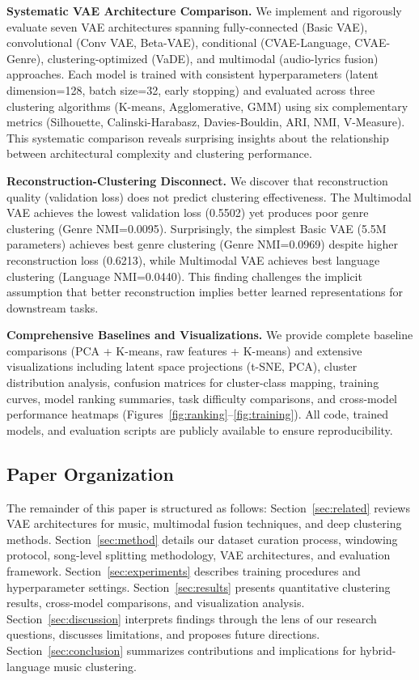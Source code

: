 \documentclass[10pt,twocolumn]{article}
\begin{document}
\textbf{Systematic VAE Architecture Comparison.} We implement and rigorously evaluate seven VAE architectures spanning fully-connected (Basic VAE), convolutional (Conv VAE, Beta-VAE), conditional (CVAE-Language, CVAE-Genre), clustering-optimized (VaDE), and multimodal (audio-lyrics fusion) approaches. Each model is trained with consistent hyperparameters (latent dimension=128, batch size=32, early stopping) and evaluated across three clustering algorithms (K-means, Agglomerative, GMM) using six complementary metrics (Silhouette, Calinski-Harabasz, Davies-Bouldin, ARI, NMI, V-Measure). This systematic comparison reveals surprising insights about the relationship between architectural complexity and clustering performance.

\textbf{Reconstruction-Clustering Disconnect.} We discover that reconstruction quality (validation loss) does not predict clustering effectiveness. The Multimodal VAE achieves the lowest validation loss (0.5502) yet produces poor genre clustering (Genre NMI=0.0095). Surprisingly, the simplest Basic VAE (5.5M parameters) achieves best genre clustering (Genre NMI=0.0969) despite higher reconstruction loss (0.6213), while Multimodal VAE achieves best language clustering (Language NMI=0.0440). This finding challenges the implicit assumption that better reconstruction implies better learned representations for downstream tasks.

\textbf{Comprehensive Baselines and Visualizations.} We provide complete baseline comparisons (PCA + K-means, raw features + K-means) and extensive visualizations including latent space projections (t-SNE, PCA), cluster distribution analysis, confusion matrices for cluster-class mapping, training curves, model ranking summaries, task difficulty comparisons, and cross-model performance heatmaps (Figures~\ref{fig:ranking}--\ref{fig:training}). All code, trained models, and evaluation scripts are publicly available to ensure reproducibility.

\subsection{Paper Organization}

The remainder of this paper is structured as follows: Section~\ref{sec:related} reviews VAE architectures for music, multimodal fusion techniques, and deep clustering methods. Section~\ref{sec:method} details our dataset curation process, windowing protocol, song-level splitting methodology, VAE architectures, and evaluation framework. Section~\ref{sec:experiments} describes training procedures and hyperparameter settings. Section~\ref{sec:results} presents quantitative clustering results, cross-model comparisons, and visualization analysis. Section~\ref{sec:discussion} interprets findings through the lens of our research questions, discusses limitations, and proposes future directions. Section~\ref{sec:conclusion} summarizes contributions and implications for hybrid-language music clustering.
\end{document}
